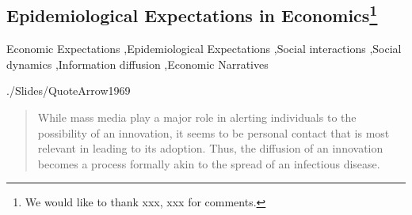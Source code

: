 

\begin{frontmatter}%

  \chapter[Chapter Title]{Epidemiological Expectations in Economics\footnote{We would like to thank xxx, xxx for comments.}}\label{chap1}


  \author*[1]{Christopher Carroll}%
  \author[2]{Tao Wang}%

  \address[1]{, , }
  \address[2]{, , }
  \address*[3]{Corresponding: }

  


  \minitoc

  \makechaptertitle

  \begin{abstract}[Abstract]
    `Epidemiological' models of belief dynamics put social interactions at their core; such models are the main (almost, the only) tool used by non-economists to study how beliefs evolve in populations.  We survey the (comparatively) small literature in which economists attempting to model the consequences of beliefs about the future -- `expectations' -- have employed a full-fledged epidemiological approach to explore an economic question.  We draw connections to related work on narrative economics, news/rumor spreading, `contagion,' and the spread of online content. Finally, we discuss a number of promising directions for future research.
  \end{abstract}

  \begin{keywords}[Keywords:]
    Economic Expectations \sep Epidemiological Expectations \sep Social interactions \sep Social dynamics \sep Information diffusion \sep Economic Narratives
  \end{keywords}

\begin{verbatimwrite}{./Slides/QuoteArrow1969}%
  \begin{quote}
    While mass media play a major role in alerting individuals to the
    possibility of an innovation, it seems to be personal contact that is
    most relevant in leading to its adoption. Thus, the diffusion of an
    innovation becomes a process formally akin to the spread of an
    infectious disease.
  \end{quote}
\end{verbatimwrite} %


\end{frontmatter}
